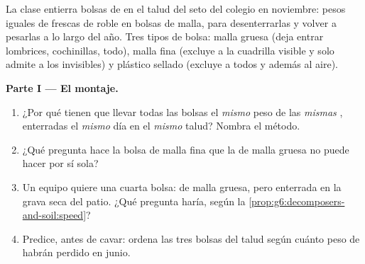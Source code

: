 \begin{problem}\label{pb:g6:decomposers-and-soil:1}
La clase entierra bolsas de  en el talud del seto del colegio en
noviembre: pesos iguales de  frescas de roble en bolsas de malla,
para desenterrarlas y volver a pesarlas a lo largo del año. Tres tipos
de bolsa: malla gruesa (deja entrar lombrices, cochinillas, todo),
malla fina (excluye a la cuadrilla visible y solo admite a los
invisibles) y plástico sellado (excluye a todos y además al aire).

\medskip\noindent\textbf{Parte I --- El montaje.}
\begin{enumerate}
  \item ¿Por qué tienen que llevar todas las bolsas el \emph{mismo}
        peso de las \emph{mismas} , enterradas el \emph{mismo}
        día en el \emph{mismo} talud? Nombra el método.
  \item ¿Qué pregunta hace la bolsa de malla fina que la de malla
        gruesa no puede hacer por sí sola?
  \item Un equipo quiere una cuarta bolsa: de malla gruesa, pero
        enterrada en la grava seca del patio. ¿Qué pregunta haría,
        según la \cref{prop:g6:decomposers-and-soil:speed}?
  \item Predice, antes de cavar: ordena las tres bolsas del talud según
        cuánto peso de  habrán perdido en junio.
\end{enumerate}


\end{problem}
